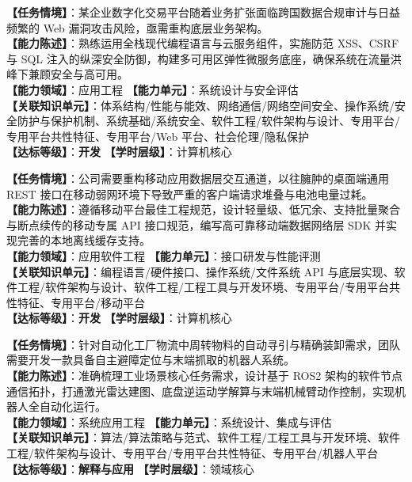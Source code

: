 \begin{taskbox}
\textbf{【任务情境】}：某企业数字化交易平台随着业务扩张面临跨国数据合规审计与日益频繁的 Web 漏洞攻击风险，亟需重构底层业务架构。\\
\textbf{【能力陈述】}：熟练运用全栈现代编程语言与云服务组件，实施防范 XSS、CSRF 与 SQL 注入的纵深安全防御，构建多可用区弹性微服务底座，确保系统在流量洪峰下兼顾安全与高可用。\\
\textbf{【能力领域】}：应用工程 \quad \textbf{【能力单元】}：系统设计与安全评估\\
\textbf{【关联知识单元】}：体系结构/性能与能效、网络通信/网络空间安全、操作系统/安全防护与保护机制、系统基础/系统安全、软件工程/软件架构与设计、专用平台/专用平台共性特征、专用平台/Web 平台、社会伦理/隐私保护\\
\textbf{【达标等级】}：\textbf{开发} \quad \textbf{【学时层级】}：计算机核心
\end{taskbox}

\begin{taskbox}
\textbf{【任务情境】}：公司需要重构移动应用数据层交互通道，以往臃肿的桌面端通用 REST 接口在移动弱网环境下导致严重的客户端请求堆叠与电池电量过耗。\\
\textbf{【能力陈述】}：遵循移动平台最佳工程规范，设计轻量级、低冗余、支持批量聚合与断点续传的移动专属 API 接口规范，编写高可靠移动端数据网络层 SDK 并实现完善的本地离线缓存支持。\\
\textbf{【能力领域】}：应用软件工程 \quad \textbf{【能力单元】}：接口研发与性能评测\\
\textbf{【关联知识单元】}：编程语言/硬件接口、操作系统/文件系统 API 与底层实现、软件工程/软件架构与设计、软件工程/工程工具与开发环境、专用平台/专用平台共性特征、专用平台/移动平台\\
\textbf{【达标等级】}：\textbf{开发} \quad \textbf{【学时层级】}：计算机核心
\end{taskbox}

\begin{taskbox}[任务 7：自主智能机器人软硬件交互系统端到端设计与实现]
\textbf{【任务情境】}：针对自动化工厂物流中周转物料的自动寻引与精确装卸需求，团队需要开发一款具备自主避障定位与末端抓取的机器人系统。\\
\textbf{【能力陈述】}：准确梳理工业场景核心任务需求，设计基于 ROS2 架构的软件节点通信拓扑，打通激光雷达建图、底盘逆运动学解算与末端机械臂动作控制，实现机器人全自动化运行。\\
\textbf{【能力领域】}：系统应用工程 \quad \textbf{【能力单元】}：系统设计、集成与评估\\
\textbf{【关联知识单元】}：算法/算法策略与范式、软件工程/工程工具与开发环境、软件工程/软件架构与设计、专用平台/专用平台共性特征、专用平台/机器人平台\\
\textbf{【达标等级】}：\textbf{解释与应用} \quad \textbf{【学时层级】}：领域核心
\end{taskbox}

